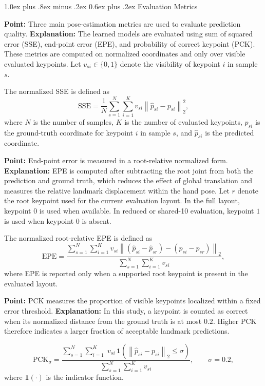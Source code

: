 \documentclass[10pt,letterpaper]{article}
\makeatletter
\renewcommand\subsection{\@startsection{subsection}{2}{\z@}%
  {1.0ex plus .8ex minus .2ex}%
  {0.6ex plus .2ex}%
  {\normalfont\itshape}}
\makeatother
\begin{document}
\subsection{Evaluation Metrics}

\noindent\textbf{Point:} Three main pose-estimation metrics are used to evaluate prediction quality.  
\textbf{Explanation:} The learned models are evaluated using sum of squared error (SSE), end-point error (EPE), and probability of correct keypoint (PCK). These metrics are computed on normalized coordinates and only over visible evaluated keypoints. Let $v_{si} \in \{0,1\}$ denote the visibility of keypoint $i$ in sample $s$.

The normalized SSE is defined as
\[
\mathrm{SSE} =
\frac{1}{N}
\sum_{s=1}^{N}
\sum_{i=1}^{K}
v_{si}\left\|
\hat{p}_{si} - p_{si}
\right\|_2^2,
\]
where $N$ is the number of samples, $K$ is the number of evaluated keypoints, $p_{si}$ is the ground-truth coordinate for keypoint $i$ in sample $s$, and $\hat{p}_{si}$ is the predicted coordinate.

\medskip
\noindent\textbf{Point:} End-point error is measured in a root-relative normalized form.  
\textbf{Explanation:} EPE is computed after subtracting the root joint from both the prediction and ground truth, which reduces the effect of global translation and measures the relative landmark displacement within the hand pose. Let $r$ denote the root keypoint used for the current evaluation layout. In the full layout, keypoint $0$ is used when available. In reduced or shared-10 evaluation, keypoint $1$ is used when keypoint $0$ is absent.

The normalized root-relative EPE is defined as
\[
\mathrm{EPE} =
\frac{
\sum_{s=1}^{N}
\sum_{i=1}^{K}
v_{si}
\left\|
(\hat{p}_{si} - \hat{p}_{sr}) - (p_{si} - p_{sr})
\right\|_2
}{
\sum_{s=1}^{N}
\sum_{i=1}^{K}
v_{si}
},
\]
where EPE is reported only when a supported root keypoint is present in the evaluated layout.

\medskip
\noindent\textbf{Point:} PCK measures the proportion of visible keypoints localized within a fixed error threshold.  
\textbf{Explanation:} In this study, a keypoint is counted as correct when its normalized distance from the ground truth is at most $0.2$. Higher PCK therefore indicates a larger fraction of acceptable landmark predictions.

\[
\mathrm{PCK}_{\sigma} =
\frac{
\sum_{s=1}^{N}
\sum_{i=1}^{K}
\;v_{si}\,\mathbf{1}
\left(
\left\|
\hat{p}_{si} - p_{si}
\right\|_2 \le \sigma
\right)
}{
\sum_{s=1}^{N}
\sum_{i=1}^{K}
v_{si}
},
\qquad \sigma = 0.2,
\]
where $\mathbf{1}(\cdot)$ is the indicator function.
\end{document}
